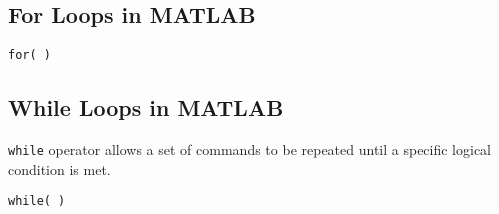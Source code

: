 \documentclass[12pt]{article} %
\begin{document}
\subsection{For Loops in MATLAB}
\begin{framed}
\begin{verbatim}
for( )

\end{verbatim}
\end{framed}
\subsection{While Loops in MATLAB}
\texttt{while} operator allows a set of commands to be repeated until a specific logical condition is met.

\begin{framed}
\begin{verbatim}
while( )

\end{verbatim}
\end{framed}
\end{document}

